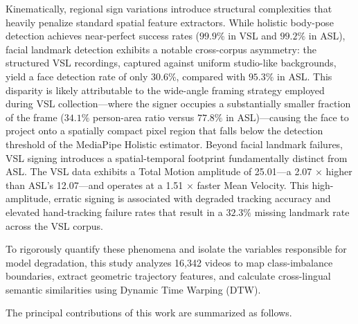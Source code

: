 \documentclass{ieeeaccess}
\begin{document}
Kinematically, regional sign variations introduce structural complexities that heavily penalize standard spatial feature extractors. While holistic body-pose detection achieves near-perfect success rates ($99.9\%$ in VSL and $99.2\%$ in ASL), facial landmark detection exhibits a notable cross-corpus asymmetry: the structured VSL recordings, captured against uniform studio-like backgrounds, yield a face detection rate of only $30.6\%$, compared with $95.3\%$ in ASL. This disparity is likely attributable to the wide-angle framing strategy employed during VSL collection—where the signer occupies a substantially smaller fraction of the frame ($34.1\%$ person-area ratio versus $77.8\%$ in ASL)—causing the face to project onto a spatially compact pixel region that falls below the detection threshold of the MediaPipe Holistic estimator. Beyond facial landmark failures, VSL signing introduces a spatial-temporal footprint fundamentally distinct from ASL. The VSL data exhibits a Total Motion amplitude of 25.01---a 2.07 $\times$ higher than ASL's 12.07---and operates at a 1.51 $\times$ faster Mean Velocity. This high-amplitude, erratic signing is associated with degraded tracking accuracy and elevated hand-tracking failure rates that result in a $32.3\%$ missing landmark rate across the VSL corpus.

To rigorously quantify these phenomena and isolate the variables responsible for model degradation, this study analyzes 16,342 videos to map class-imbalance boundaries, extract geometric trajectory features, and calculate cross-lingual semantic similarities using Dynamic Time Warping (DTW). 

The principal contributions of this work are summarized as follows.
\end{document}
